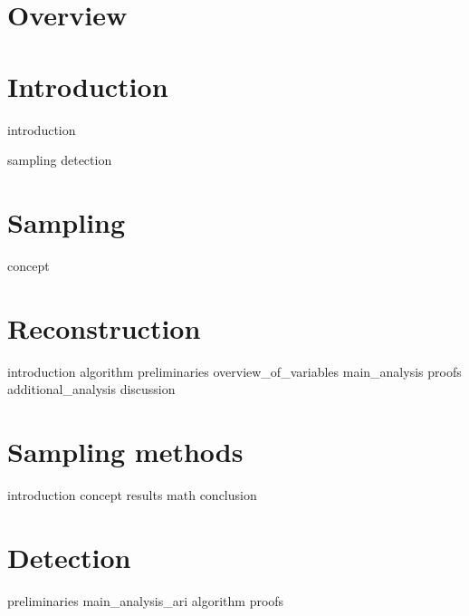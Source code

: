 \documentclass[a4paper, openany, oneside]{memoir}
\begin{document}
\chapter{Overview}

\chapter{Introduction}
{introduction}

{sampling}
{detection}


\chapter{Sampling}

{concept}

\chapter{Reconstruction}

{introduction}
{algorithm}
{preliminaries}
{overview_of_variables}
{main_analysis}
{proofs}
{additional_analysis}
{discussion}

\chapter{Sampling methods}

{introduction}
{concept}
{results}
{math} 
{conclusion}


\chapter{Detection}

{preliminaries}
{main_analysis_ari}
{algorithm}
{proofs}
\end{document}
